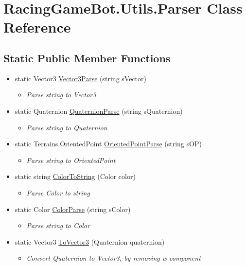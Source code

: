 \hypertarget{classRacingGameBot_1_1Utils_1_1Parser}{}
\section{RacingGameBot.Utils.Parser Class Reference}
\label{classRacingGameBot_1_1Utils_1_1Parser}
\subsection*{Static Public Member Functions}

\begin{itemize}
\item[] 
static Vector3 \mbox{\hyperlink{classRacingGameBot_1_1Utils_1_1Parser_a9403845569f7e26c769be6b329857444}{Vector3Parse}} (string sVector)
\begin{itemize}\small\item[] \em Parse string to Vector3 \end{itemize}\item[] 
static Quaternion \mbox{\hyperlink{classRacingGameBot_1_1Utils_1_1Parser_a7c96e02082e3e61ce5f48aab4e1483bd}{QuaternionParse}} (string sQuaternion)
\begin{itemize}\small\item[] \em Parse string to Quaternion \end{itemize}\item[] 
static Terrains.OrientedPoint \mbox{\hyperlink{classRacingGameBot_1_1Utils_1_1Parser_a3c480c43d443d7a0471bc2dfce8ca93c}{OrientedPointParse}} (string sOP)
\begin{itemize}\small\item[] \em Parse string to OrientedPoint \end{itemize}\item[] 
static string \mbox{\hyperlink{classRacingGameBot_1_1Utils_1_1Parser_a8ac3632ea7b3a765575e137bd82e3bb2}{ColorToString}} (Color color)
\begin{itemize}\small\item[] \em Parse Color to string \end{itemize}\item[] 
static Color \mbox{\hyperlink{classRacingGameBot_1_1Utils_1_1Parser_adf68b81dde03ee088d7e152409bd6b83}{ColorParse}} (string sColor)
\begin{itemize}\small\item[] \em Parse string to Color \end{itemize}\item[] 
static Vector3 \mbox{\hyperlink{classRacingGameBot_1_1Utils_1_1Parser_a0892ed3ac8c671fdcbc0ee1959b98ab2}{ToVector3}} (Quaternion quaternion)
\begin{itemize}\small\item[] \em Convert Quaternion to Vector3, by removing \textquotesingle{}w\textquotesingle{} component \end{itemize}\end{itemize}


